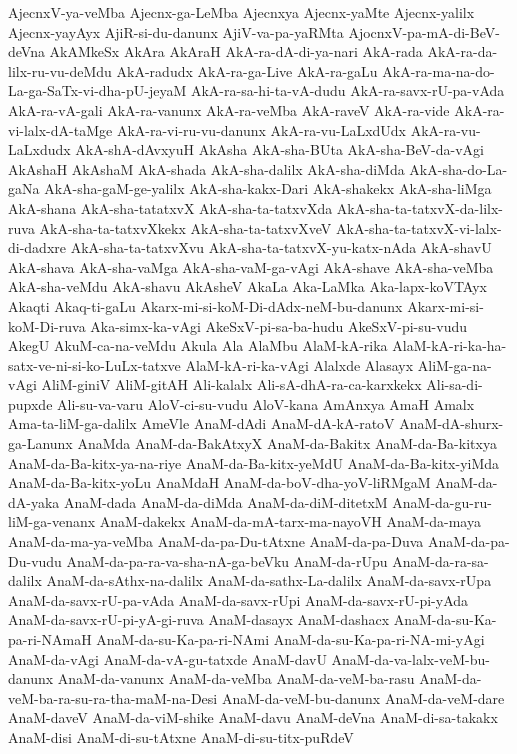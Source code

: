 {AjecnxV-ya-veMba
Ajecnx-ga-LeMba
Ajecnxya
Ajecnx-yaMte
Ajecnx-yalilx
Ajecnx-yayAyx
AjiR-si-du-danunx
AjiV-va-pa-yaRMta
AjocnxV-pa-mA-di-BeV-deVna
AkAMkeSx
AkAra
AkAraH
AkA-ra-dA-di-ya-nari
AkA-rada
AkA-ra-da-lilx-ru-vu-deMdu
AkA-radudx
AkA-ra-ga-Live
AkA-ra-gaLu
AkA-ra-ma-na-do-La-ga-SaTx-vi-dha-pU-jeyaM
AkA-ra-sa-hi-ta-vA-dudu
AkA-ra-savx-rU-pa-vAda
AkA-ra-vA-gali
AkA-ra-vanunx
AkA-ra-veMba
AkA-raveV
AkA-ra-vide
AkA-ra-vi-lalx-dA-taMge
AkA-ra-vi-ru-vu-danunx
AkA-ra-vu-LaLxdUdx
AkA-ra-vu-LaLxdudx
AkA-shA-dAvxyuH
AkAsha
AkA-sha-BUta
AkA-sha-BeV-da-vAgi
AkAshaH
AkAshaM
AkA-shada
AkA-sha-dalilx
AkA-sha-diMda
AkA-sha-do-La-gaNa
AkA-sha-gaM-ge-yalilx
AkA-sha-kakx-Dari
AkA-shakekx
AkA-sha-liMga
AkA-shana
AkA-sha-tatatxvX
AkA-sha-ta-tatxvXda
AkA-sha-ta-tatxvX-da-lilx-ruva
AkA-sha-ta-tatxvXkekx
AkA-sha-ta-tatxvXveV
AkA-sha-ta-tatxvX-vi-lalx-di-dadxre
AkA-sha-ta-tatxvXvu
AkA-sha-ta-tatxvX-yu-katx-nAda
AkA-shavU
AkA-shava
AkA-sha-vaMga
AkA-sha-vaM-ga-vAgi
AkA-shave
AkA-sha-veMba
AkA-sha-veMdu
AkA-shavu
AkAsheV
AkaLa
Aka-LaMka
Aka-lapx-koVTAyx
Akaqti
Akaq-ti-gaLu
Akarx-mi-si-koM-Di-dAdx-neM-bu-danunx
Akarx-mi-si-koM-Di-ruva
Aka-simx-ka-vAgi
AkeSxV-pi-sa-ba-hudu
AkeSxV-pi-su-vudu
AkegU
AkuM-ca-na-veMdu
Akula
Ala
AlaMbu
AlaM-kA-rika
AlaM-kA-ri-ka-ha-satx-ve-ni-si-ko-LuLx-tatxve
AlaM-kA-ri-ka-vAgi
Alalxde
Alasayx
AliM-ga-na-vAgi
AliM-giniV
AliM-gitAH
Ali-kalalx
Ali-sA-dhA-ra-ca-karxkekx
Ali-sa-di-pupxde
Ali-su-va-varu
AloV-ci-su-vudu
AloV-kana
AmAnxya
AmaH
Amalx
Ama-ta-liM-ga-dalilx
AmeVle
AnaM-dAdi
AnaM-dA-kA-ratoV
AnaM-dA-shurx-ga-Lanunx
AnaMda
AnaM-da-BakAtxyX
AnaM-da-Bakitx
AnaM-da-Ba-kitxya
AnaM-da-Ba-kitx-ya-na-riye
AnaM-da-Ba-kitx-yeMdU
AnaM-da-Ba-kitx-yiMda
AnaM-da-Ba-kitx-yoLu
AnaMdaH
AnaM-da-boV-dha-yoV-liRMgaM
AnaM-da-dA-yaka
AnaM-dada
AnaM-da-diMda
AnaM-da-diM-ditetxM
AnaM-da-gu-ru-liM-ga-venanx
AnaM-dakekx
AnaM-da-mA-tarx-ma-nayoVH
AnaM-da-maya
AnaM-da-ma-ya-veMba
AnaM-da-pa-Du-tAtxne
AnaM-da-pa-Duva
AnaM-da-pa-Du-vudu
AnaM-da-pa-ra-va-sha-nA-ga-beVku
AnaM-da-rUpu
AnaM-da-ra-sa-dalilx
AnaM-da-sAthx-na-dalilx
AnaM-da-sathx-La-dalilx
AnaM-da-savx-rUpa
AnaM-da-savx-rU-pa-vAda
AnaM-da-savx-rUpi
AnaM-da-savx-rU-pi-yAda
AnaM-da-savx-rU-pi-yA-gi-ruva
AnaM-dasayx
AnaM-dashacx
AnaM-da-su-Ka-pa-ri-NAmaH
AnaM-da-su-Ka-pa-ri-NAmi
AnaM-da-su-Ka-pa-ri-NA-mi-yAgi
AnaM-da-vAgi
AnaM-da-vA-gu-tatxde
AnaM-davU
AnaM-da-va-lalx-veM-bu-danunx
AnaM-da-vanunx
AnaM-da-veMba
AnaM-da-veM-ba-rasu
AnaM-da-veM-ba-ra-su-ra-tha-maM-na-Desi
AnaM-da-veM-bu-danunx
AnaM-da-veM-dare
AnaM-daveV
AnaM-da-viM-shike
AnaM-davu
AnaM-deVna
AnaM-di-sa-takakx
AnaM-disi
AnaM-di-su-tAtxne
AnaM-di-su-titx-puRdeV
}
